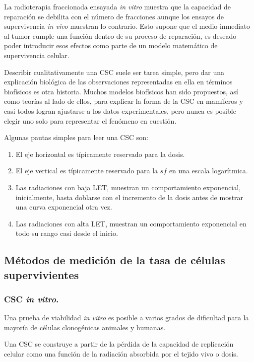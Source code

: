 \documentclass[12pt,letterpaper, oneside]{book}
\begin{document}
				La radioterapia fraccionada ensayada \textit{in vitro} muestra que la capacidad de reparación se debilita con el número de fracciones aunque los ensayos de supervivencia \textit{in vivo} muestran lo contrario\cite{Bleehen.2007}. Esto supone que el medio inmediato al tumor cumple una función dentro de su proceso de reparación, es deseado poder introducir esos efectos como parte de un modelo matemático de supervivencia celular.
				
				Describir cualitativamente una CSC suele ser tarea simple, pero dar una explicación biológica de las observaciones representadas en ella en términos biofísicos es otra historia\cite{Hall.2000}. Muchos modelos biofísicos han sido propuestos, así como teorías al lado de ellos, para explicar la forma de la CSC en mamíferos y casi todos logran ajustarse a los datos experimentales, pero nunca es posible elegir uno solo para representar el fenómeno en cuestión\cite{Hall.2000}.
				
				Algunas pautas simples para leer una CSC\cite{Hall.2000} son:
				\begin{enumerate}
					\item El eje horizontal es típicamente reservado para la dosis.
					\item El eje vertical es típicamente reservado para la $sf$ en una escala logarítmica.
					\item Las radiaciones con baja LET, muestran un comportamiento exponencial, inicialmente, hasta doblarse con el incremento de la dosis antes de mostrar una curva exponencial otra vez. 
					\item Las radiaciones con alta LET, muestran un comportamiento exponencial en todo su rango casi desde el inicio.
				\end{enumerate}

			\subsection{Métodos de medición de la tasa de células supervivientes}
				\subsubsection{CSC \textit{in vitro}.}
				Una prueba de viabilidad \textit{in vitro} es posible a varios grados de dificultad para la mayoría de células clonogénicas animales y humanas\cite{Tubiana.1990}. 
				
				Una CSC se construye a partir de la pérdida de la capacidad de replicación celular como una función de la radiación absorbida por el tejido vivo o dosis\cite{Hall.2000}. 
				
\end{document}
